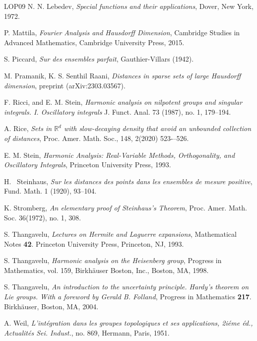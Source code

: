 \documentclass[11pt, reqno]{amsart}
\theoremstyle{plain}
\theoremstyle{remark}
\theoremstyle{example}
\theoremstyle{definition}
\numberwithin{equation}{section}
\begin{document}
\begin{thebibliography}{LOP{\etalchar{+}}09}
 N. N. Lebedev, \textit{Special functions and their applications}, Dover, New York, 1972.

 P. Mattila, \textit{Fourier Analysis and Hausdorff Dimension}, Cambridge Studies in Advanced Mathematics, Cambridge University Press, 2015.

 S. Piccard, \textit{Sur des ensembles parfait}, Gauthier-Villars (1942). 

 M. Pramanik, K. S. Senthil Raani, \textit{Distances in sparse sets of large Hausdorff dimension}, preprint (arXiv:2303.03567).

 F. Ricci, and E. M. Stein, \textit{Harmonic analysis on nilpotent groups and singular integrals. I. Oscillatory integrals} J. Funct. Anal. 73 (1987), no. 1, 179–194.

 A. Rice, \textit{Sets in $\mathbb R^d$ with slow-decaying density that avoid an unbounded collection of distances}, Proc. Amer. Math. Soc., 148, 2(2020) 523-–526.

 E. M. Stein, \textit{Harmonic Analysis: Real-Variable Methods, Orthogonality, and Oscillatory Integrals}, Princeton University Press, 1993.

 H. \ Steinhaus, \textit{Sur les distances des points dans les ensembles de mesure positive}, Fund. Math. 1 (1920), 93–104.


 K. Stromberg, \emph{An elementary proof of Steinhaus's Theorem}, Proc. Amer. Math. Soc. 36(1972), no. 1, 308.


  S. Thangavelu, \emph{Lectures on Hermite and Laguerre expansions}, Mathematical Notes {\bf 42}. Princeton University Press, Princeton, NJ, 1993.

S. Thangavelu, \emph{Harmonic analysis on the {H}eisenberg group},
  Progress in Mathematics, vol. 159, Birkh\"{a}user Boston, Inc., Boston, MA,
  1998.

 S. Thangavelu, \emph{An introduction to the uncertainty principle. Hardy's theorem on Lie groups. With a foreword by Gerald B. Folland}, Progress in Mathematics {\bf 217}. Birkh\"auser, Boston, MA, 2004.

 A. Weil, \emph{L'int\'egration dans les groupes topologiques et ses applications, 2i\'eme \'ed., Actualit\'es Sei. Indust.}, no. 869, Hermann, Paris, 1951.

\end{thebibliography}
\end{document}
